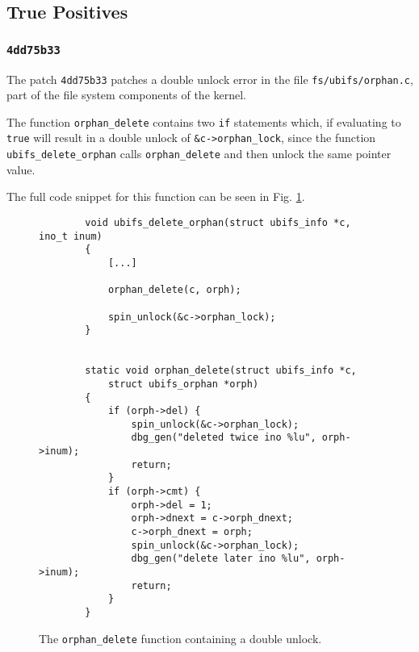 \subsection{True Positives}

\subsubsection{\texttt{4dd75b33}}

\newpar The patch \texttt{4dd75b33} patches a double unlock error in the file \texttt{fs/ubifs/orphan.c}, part of the file system components of the kernel.

\newpar The function \texttt{orphan\_delete} contains two \texttt{if} statements which, if evaluating to \texttt{true} will result in a double unlock of \texttt{\&c->orphan\_lock}, since the function \texttt{ubifs\_delete\_orphan} calls \texttt{orphan\_delete} and then unlock the same pointer value. 

\newpar The full code snippet for this function can be seen in Fig. \ref{fig:orphan.c}.

\begin{figure}[h]
    \centering
    \begin{verbatim}
        void ubifs_delete_orphan(struct ubifs_info *c, ino_t inum)
        {
            [...]
            
            orphan_delete(c, orph);

            spin_unlock(&c->orphan_lock);
        }


        static void orphan_delete(struct ubifs_info *c, 
            struct ubifs_orphan *orph)
        {
            if (orph->del) {
                spin_unlock(&c->orphan_lock);
                dbg_gen("deleted twice ino %lu", orph->inum);
                return;
            }
            if (orph->cmt) {
                orph->del = 1;
                orph->dnext = c->orph_dnext;
                c->orph_dnext = orph;
                spin_unlock(&c->orphan_lock);
                dbg_gen("delete later ino %lu", orph->inum);
                return;
            }
        }
    \end{verbatim}
    \caption{The \texttt{orphan\_delete} function containing a double unlock.}
    \label{fig:orphan.c}
\end{figure}